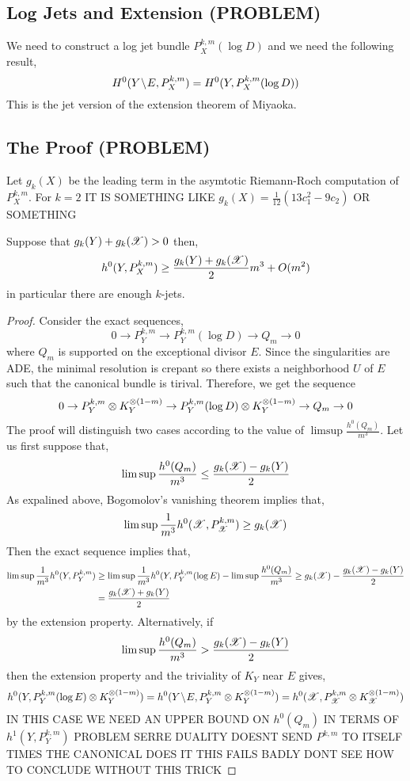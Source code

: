 \documentclass[12pt]{article}
\begin{document}
\subsection{Log Jets and Extension (PROBLEM)}

We need to construct a log jet bundle $P_X^{k,m}(\log{D})$ and we need the following result,
\[ H^0(Y \! \setminus \! E, P_X^{k,m}) = H^0(Y, P_X^{k,m}(\log{D})) \]
This is the jet version of the extension theorem of Miyaoka.

\subsection{The Proof (PROBLEM)}

Let $g_k(X)$ be the leading term in the asymtotic Riemann-Roch computation of $P^{k, m}_X$. {\color{red} For $k = 2$ IT IS SOMETHING LIKE $g_k(X) = \frac{1}{12}(13 c_1^2 - 9 c_2)$ OR SOMETHING}

\begin{theorem}
Suppose that $g_k(Y) + g_k(\mathscr{X}) > 0$ then,
\[ h^0(Y, P^{k,m}_X) \ge \frac{g_k(Y) + g_k(\mathscr{X})}{2} m^3 + O(m^2) \]
in particular there are enough $k$-jets.
\end{theorem}

\begin{proof}
Consider the exact sequences,
\[ 0 \to P^{k,m}_Y \to P^{k,m}_Y(\log{D}) \to Q_m \to 0 \]
where $Q_m$ is supported on the exceptional divisor $E$. Since the singularities are ADE, the minimal resolution is crepant so there exists a neighborhood $U$ of $E$ such that the canonical bundle is tirival. Therefore, we get the sequence
\[ 0 \to P^{k,m}_Y \otimes K_Y^{\otimes (1 - m)} \to P^{k,m}_Y(\log{D}) \otimes K_Y^{\otimes (1 - m)} \to Q_m \to 0 \]
The proof will distinguish two cases according to the value of $\limsup \frac{h^0(Q_m)}{m^3}$.
Let us first suppose that,
\[ \limsup \frac{h^0(Q_m)}{m^3} \le \frac{g_k(\mathscr{X}) - g_k(Y)}{2} \]
As expalined above, Bogomolov's vanishing theorem implies that,
\[ \limsup \frac{1}{m^3} h^0(\mathscr{X}, P^{k,m}_{\mathscr{X}}) \ge g_k(\mathscr{X}) \]
Then the exact sequence implies that,
\begin{align*}
\limsup \frac{1}{m^3} h^0(Y, P^{k,m}_Y) & \ge \limsup \frac{1}{m^3} h^0(Y, P^{k,m}_Y(\log{E}) - \limsup \frac{h^0(Q_m)}{m^3} \ge g_k(\mathscr{X}) - \frac{g_k(\mathscr{X}) - g_k(Y)}{2} 
\\
&= \frac{g_k(\mathscr{X}) + g_k(Y)}{2}
\end{align*}
by the extension property. Alternatively, if
\[ \limsup \frac{h^0(Q_m)}{m^3} > \frac{g_k(\mathscr{X}) - g_k(Y)}{2} \]
then the extension property and the triviality of $K_Y$ near $E$ gives,
\begin{align*}
h^0(Y, P^{k,m}_Y(\log{E}) \otimes K_Y^{\otimes (1-m)}) = h^0(Y \! \setminus \! E, P^{k,m}_Y \otimes K_Y^{\otimes (1 - m)}) = h^0(\mathscr{X}, P^{k,m}_{\mathscr{X}} \otimes K_{\mathscr{X}}^{\otimes (1 - m)})
\end{align*}
{\color{red} IN THIS CASE WE NEED AN UPPER BOUND ON $h^0(Q_m)$ IN TERMS OF $h^1(Y, P^{k,m}_Y)$ }
PROBLEM SERRE DUALITY DOESNT SEND $P^{k,m}$ TO ITSELF TIMES THE CANONICAL DOES IT
{\color{red} THIS FAILS BADLY DONT SEE HOW TO CONCLUDE WITHOUT THIS TRICK}
\end{proof}
\end{document}
